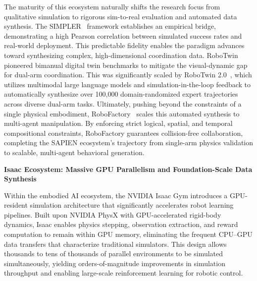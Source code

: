 \documentclass[acmsmall,screen,review,anonymous]{acmart}
\begin{document}
The maturity of this ecosystem naturally shifts the research focus from qualitative simulation to rigorous sim-to-real evaluation and automated data synthesis. 
The SIMPLER~\cite{li2025simpler} framework establishes an empirical bridge, demonstrating a high Pearson correlation between simulated success rates and real-world deployment. 
This predictable fidelity enables the paradigm advances toward synthesizing complex, high-dimensional coordination data. RoboTwin~\cite{mu2024robotwin} pioneered bimanual digital twin benchmarks to mitigate the visual-dynamic gap for dual-arm coordination. This was significantly scaled by RoboTwin 2.0~\cite{chen2025robotwin2}, which utilizes multimodal large language models and simulation-in-the-loop feedback to automatically synthesize over 100,000 domain-randomized expert trajectories across diverse dual-arm tasks. Ultimately, pushing beyond the constraints of a single physical embodiment, RoboFactory~\cite{qin2025robofactory} scales this automated synthesis to multi-agent manipulation. By enforcing strict logical, spatial, and temporal compositional constraints, RoboFactory guarantees collision-free collaboration, completing the SAPIEN ecosystem's trajectory from single-arm physics validation to scalable, multi-agent behavioral generation.

\textbf{Isaac Ecosystem: Massive GPU Parallelism and Foundation-Scale Data Synthesis}

Within the embodied AI ecosystem, the NVIDIA Isaac Gym introduces a GPU-resident simulation architecture that significantly accelerates robot learning pipelines. Built upon NVIDIA PhysX with GPU-accelerated rigid-body dynamics, Isaac enables physics stepping, observation extraction, and reward computation to remain within GPU memory, eliminating the frequent CPU–GPU data transfers that characterize traditional simulators. This design allows thousands to tens of thousands of parallel environments to be simulated simultaneously, yielding orders-of-magnitude improvements in simulation throughput and enabling large-scale reinforcement learning for robotic control.
\end{document}
